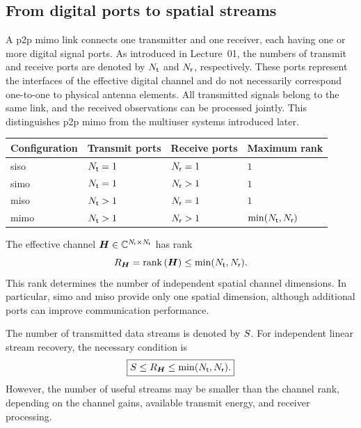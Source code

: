 \subsection{From digital ports to spatial streams}

A \ac{p2p} \ac{mimo} link connects one transmitter and one receiver, each having one or more digital signal ports. As introduced in Lecture~01, the numbers of transmit and receive ports are denoted by $N_{\mathsf{t}}$ and $N_{\mathsf{r}}$, respectively. These ports represent the interfaces of the effective digital channel and do not necessarily correspond one-to-one to physical antenna elements. All transmitted signals belong to the same link, and the received observations can be processed jointly. This distinguishes \ac{p2p} \ac{mimo} from the multiuser systems introduced later.

\begin{center}
	\begin{tabular}{llll}
		\toprule
		Configuration & Transmit ports & Receive ports & Maximum rank\\
		\midrule
		\acs{siso} & $N_{\mathsf{t}}=1$ & $N_{\mathsf{r}}=1$ & $1$\\
		\acs{simo} & $N_{\mathsf{t}}=1$ & $N_{\mathsf{r}}>1$ & $1$\\
		\acs{miso} & $N_{\mathsf{t}}>1$ & $N_{\mathsf{r}}=1$ & $1$\\
		\acs{mimo} & $N_{\mathsf{t}}>1$ & $N_{\mathsf{r}}>1$ & $\min(N_{\mathsf{t}},N_{\mathsf{r}})$\\
		\bottomrule
	\end{tabular}
\end{center}

The effective channel $\bm{H}\in\mathbb{C}^{N_{\mathsf{r}}\times N_{\mathsf{t}}}$ has rank
\begin{equation}
	R_{\bm{H}}=\operatorname{rank}\left(\bm{H}\right)\leq\min(N_{\mathsf{t}},N_{\mathsf{r}}).
\end{equation}
This rank determines the number of independent spatial channel dimensions. In particular, \ac{simo} and \ac{miso} provide only one spatial dimension, although additional ports can improve communication performance.

The number of transmitted data streams is denoted by $S$. For independent linear stream recovery, the necessary condition is
\begin{equation}
	\boxed{S\leq R_{\bm{H}}\leq\min(N_{\mathsf{t}},N_{\mathsf{r}}).}
\end{equation}
However, the number of useful streams may be smaller than the channel rank, depending on the channel gains, available transmit energy, and receiver processing.


